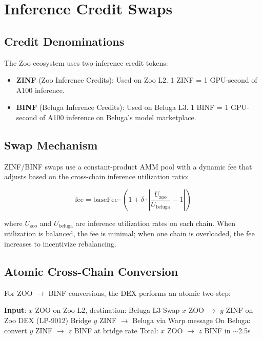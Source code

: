 \documentclass[11pt,letterpaper]{article}
\begin{document}
\section{Inference Credit Swaps}
\label{sec:credits}

\subsection{Credit Denominations}

The Zoo ecosystem uses two inference credit tokens:

\begin{itemize}
    \item \textbf{ZINF} (Zoo Inference Credits): Used on Zoo L2. 1 ZINF = 1 GPU-second of A100 inference.
    \item \textbf{BINF} (Beluga Inference Credits): Used on Beluga L3. 1 BINF = 1 GPU-second of A100 inference on Beluga's model marketplace.
\end{itemize}

\subsection{Swap Mechanism}

ZINF/BINF swaps use a constant-product AMM pool with a dynamic fee that adjusts based on the cross-chain inference utilization ratio:

\begin{equation}
\text{fee} = \text{baseFee} \cdot \left(1 + \delta \cdot \left|\frac{U_{\text{zoo}}}{U_{\text{beluga}}} - 1\right|\right)
\end{equation}

where $U_{\text{zoo}}$ and $U_{\text{beluga}}$ are inference utilization rates on each chain. When utilization is balanced, the fee is minimal; when one chain is overloaded, the fee increases to incentivize rebalancing.

\subsection{Atomic Cross-Chain Conversion}

For ZOO $\to$ BINF conversions, the DEX performs an atomic two-step:

\begin{algorithm}[t]
\caption{Atomic Inference Credit Conversion}
\label{alg:credits}
\begin{algorithmic}[1]
\STATE \textbf{Input}: $x$ ZOO on Zoo L2, destination: Beluga L3
\STATE Swap $x$ ZOO $\to$ $y$ ZINF on Zoo DEX (LP-9012)
\STATE Bridge $y$ ZINF $\to$ Beluga via Warp message
\STATE On Beluga: convert $y$ ZINF $\to$ $z$ BINF at bridge rate
\STATE Total: $x$ ZOO $\to$ $z$ BINF in $\sim$2.5s
\end{algorithmic}
\end{algorithm}
\end{document}
